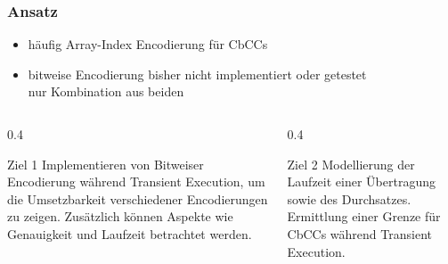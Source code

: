\begin{frame}
    \frametitle{Ansatz}

    \begin{itemize}
        \item häufig Array-Index Encodierung für \acp{CbCC}
        \item bitweise Encodierung bisher nicht implementiert oder getestet\\
        \textrightarrow\space nur Kombination aus beiden \cite{hertogh_rain_nodate}
    \end{itemize}


    \pause

    \begin{columns}[t]
        \begin{column}{0.4\textwidth}
            \begin{block}{Ziel 1}
                Implementieren von Bitweiser Encodierung während Transient Execution,
                um die Umsetzbarkeit verschiedener Encodierungen zu zeigen.
                Zusätzlich können Aspekte wie Genauigkeit und Laufzeit betrachtet werden.
            \end{block}
        \end{column}
        \pause
        \begin{column}{0.4\textwidth}
            \begin{block}{Ziel 2}
                Modellierung der Laufzeit einer Übertragung sowie des Durchsatzes.
                Ermittlung einer Grenze für \acp{CbCC} während Transient Execution.
            \end{block}
        \end{column}
    \end{columns}

\end{frame}

